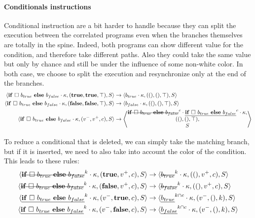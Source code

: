 \documentclass[a4paper,11pt]{article}
\newcommand\mathst[1]{\text{\st{$#1$}}}
\newcommand\mathul[1]{\text{\ul{$#1$}}}
\newcommand\rtstate[3]{\langle #1, #2, #3\rangle}
\newcommand\vrtstate[3]{\left\langle\begin{matrix}#1,\\#2,\\#3\end{matrix}\right\rangle}
\begin{document}
\paragraph{Conditionals instructions} Conditional instruction are a bit harder to handle because they can split the execution between the correlated programs even when the branches themselves are totally in the spine. Indeed, both programs can show different value for the condition, and therefore take different paths. Also they could take the same value but only by chance and still be under the influence of some non-white color. In both case, we choose to split the execution and resynchronize only at the end of the branches.
\begin{align*}
\rtstate{\mathbf{if}\ \square\ b_{true}\ \mathbf{else}\ b_{false} \cdot  \kappa}{(\mathbf{true}, \mathbf{true}, \top)}{S} &\rightarrow \rtstate{b_{true} \cdot \kappa}{((), (), \top)}{S}\\
\rtstate{\mathbf{if}\ \square\ b_{true}\ \mathbf{else}\ b_{false} \cdot  \kappa}{(\mathbf{false}, \mathbf{false}, \top)}{S} &\rightarrow \rtstate{b_{false} \cdot \kappa}{((), (), \top)}{S}\\
\rtstate{\mathbf{if}\ \square\ b_{true}\ \mathbf{else}\ b_{false} \cdot \kappa}{(v^-, v^+, c)}{S} &\rightarrow \vrtstate{\mathst{\mathbf{if}\ \square\ b_{true}\ \mathbf{else}\ b_{false}}^c \cdot \mathul{\mathbf{if}\ \square\ b_{true}\ \mathbf{else}\ b_{false}}^c \cdot \kappa}{((), (), \top)}{S}\\
\end{align*}

To reduce a conditional that is deleted, we can simply take the matching branch, but if it is inserted, we need to also take into account the color of the condition. This leads to these rules:
\begin{align*}
\rtstate{\mathst{\mathbf{if}\ \square\ b_{true}\ \mathbf{else}\ b_{false}}^k \cdot  \kappa}{(\mathbf{true}, v^+, c)}{S} &\rightarrow \rtstate{\mathst{b_{true}}^k \cdot \kappa}{((), v^+, c)}{S}\\
\rtstate{\mathst{\mathbf{if}\ \square\ b_{true}\ \mathbf{else}\ b_{false}}^k \cdot  \kappa}{(\mathbf{false}, v^+, c)}{S} &\rightarrow \rtstate{\mathst{b_{false}}^k \cdot \kappa}{((), v^+, c)}{S}\\
\rtstate{\mathul{\mathbf{if}\ \square\ b_{true}\ \mathbf{else}\ b_{false}}^k \cdot \kappa}{(v^-, \mathbf{true}, c)}{S} &\rightarrow \rtstate{\mathul{b_{true}}^{k \cap c} \cdot \kappa}{(v^-, (), k)}{S}\\
\rtstate{\mathul{\mathbf{if}\ \square\ b_{true}\ \mathbf{else}\ b_{false}}^k \cdot \kappa}{(v^-, \mathbf{false}, c)}{S} &\rightarrow \rtstate{\mathul{b_{false}}^{k \cap c} \cdot \kappa}{(v^-, (), k)}{S}\\
\end{align*}
\end{document}
